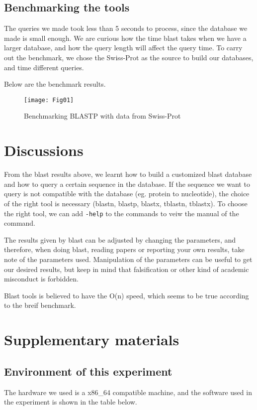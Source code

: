 \documentclass[en,black,10pt,normal]{elegantnote}
\newcommand{\upcite}[1]{\textsuperscript{\textsuperscript{\cite{#1}}}}
\begin{document}
\subsection{Benchmarking the tools}

The queries we made took less than 5 seconds to process, 
since the database we made is small enough.
We are curious how the time blast takes when we have a larger database, and
how the query length will affect the query time.
To carry out the benchmark, we chose the Swiss-Prot as the source to build 
our databases, and time different queries.

Below are the benchmark results.

\begin{figure}[H]
    \centering
    \texttt{[image: Fig01]}
    \caption{Benchmarking BLASTP with data from Swiss-Prot\upcite{boeckmann2003swiss}}
    \label{fig01}
\end{figure}

\section{Discussions}

From the blast results above,
we learnt how to build a customized blast database
and how to query a certain sequence in the database.
If the sequence we want to query is not compatible with
the database (eg. protein to nucleotide), the choice of the right
tool is necessary (blastn, blastp, blastx, tblastn, tblastx).
To choose the right tool, we can add \lstinline{-help} to the
commands to veiw the manual of the command.

The results given by blast can be adjusted by changing the
parameters, and therefore, when doing blast, reading papers or 
reporting your own results, take note of the parameters used.
Manipulation of the parameters can be useful to get
our desired results, but keep in mind that falsification or 
other kind of academic misconduct is forbidden.

Blast tools is believed to have the O(n) speed,
which seems to be true according to the breif benchmark.




\section{Supplementary materials}



\subsection{Environment of this experiment}
The hardware we used is a x86\_64 compatible machine,
and the software used in the experiment is shown in the table below.
\end{document}
